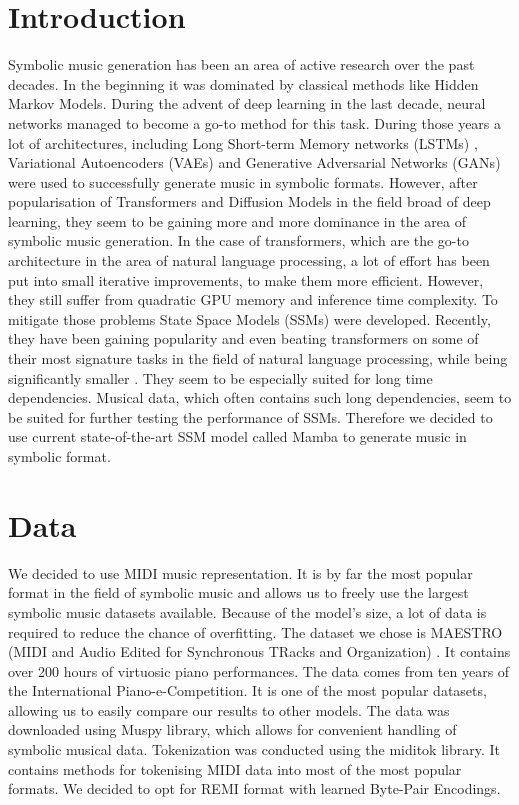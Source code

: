 \documentclass[conference]{IEEEtran}
\begin{document}
\section{Introduction}
Symbolic music generation has been an area of active research over the past decades. In the beginning it was dominated by classical methods like Hidden Markov Models. During the advent of deep learning in the last decade, neural networks managed to become a go-to method for this task. During those years a lot of architectures, including Long Short-term Memory networks (LSTMs) \cite{lstm}, Variational Autoencoders (VAEs) \cite{kingma2022autoencoding} and Generative Adversarial Networks (GANs) \cite{goodfellow2014generative} were used to successfully generate music in symbolic formats. However, after popularisation of Transformers \cite{attention-is-all-you-need} and Diffusion Models \cite{ho2020denoising} in the field broad of deep learning, they seem to be gaining more and more dominance in the area of symbolic music generation.  In the case of transformers, which are the go-to architecture in the area of natural language processing, a lot of effort has been put into small iterative improvements, to make them more efficient. However, they still suffer from quadratic GPU memory and inference time complexity. To mitigate those problems State Space Models (SSMs) \cite{ssm} were developed.  Recently, they have been gaining popularity and even beating transformers on some of their most signature tasks in the field of natural language processing, while being significantly smaller \cite{mamba}. They seem to be especially suited for long time dependencies. Musical data, which often contains such long dependencies, seem to be suited for further testing the performance of SSMs. Therefore we decided to use current state-of-the-art SSM model called Mamba \cite{mamba} to generate music in symbolic format.

\section{Data}
We decided to use MIDI \cite{midi} music representation. It is by far the most popular format in the field of symbolic music and allows us to freely use the largest symbolic music datasets available. Because of the model's size, a lot of data is required to reduce the chance of overfitting. The dataset we chose is MAESTRO (MIDI and Audio Edited for Synchronous TRacks and Organization) \cite{maestro1} \cite{maestro2}. It contains over 200 hours of virtuosic piano performances. The data comes from ten years of the International Piano-e-Competition. It is one of the most popular datasets, allowing us to easily compare our results to other models. The data was downloaded using Muspy \cite{muspy} library, which allows for convenient handling of symbolic musical data. Tokenization was conducted using the miditok \cite{miditok2021} library. It contains methods for tokenising MIDI data into most of the most popular formats. We decided to opt for REMI \cite{remi} format with learned Byte-Pair Encodings.
\end{document}
